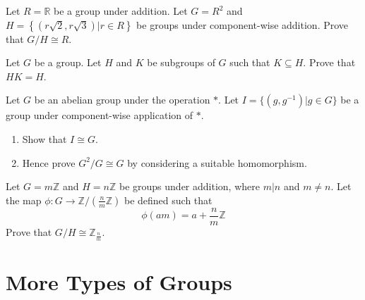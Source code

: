 \begin{problem}
    Let $R = \mathbb{R}$ be a group under addition. Let $G = R^2$ and $H = \left\{(r\sqrt2, r\sqrt3) \vert r\in R\right\}$ be groups under component-wise addition. Prove that $G/H \cong R$.
\end{problem}

\begin{problem}\label{problem-subgroup-product-equal-to-subgroup-if-one-is-subgroup-of-another}
    Let $G$ be a group. Let $H$ and $K$ be subgroups of $G$ such that $K \subseteq H$. Prove that $HK = H$.
\end{problem}

\begin{problem}\label{problem-cartesian-product-of-group-by-group-isomorphic-to-group}
    Let $G$ be an abelian group under the operation $\ast$. Let $I = \{(g, g^{-1}) \vert g \in G\}$ be a group under component-wise application of $\ast$.
    \begin{enumerate}[label=(\roman*)]
        \item Show that $I \cong G$.
        \item Hence prove $G^2/G \cong G$ by considering a suitable homomorphism.
    \end{enumerate}
\end{problem}

\begin{problem}\label{problem-mZ/nZ-isomorphic-to-Zn/m}
    Let $G = m\mathbb{Z}$ and $H = n\mathbb{Z}$ be groups under addition, where $m\vert n$ and $m \neq n$. Let the map $\phi: G \to \mathbb{Z}/({\frac nm}\mathbb{Z})$ be defined such that
    \[
        \phi(am) = a + \frac nm \mathbb{Z}
    \]
    Prove that $G/H \cong \mathbb{Z}_{\frac nm}$.
\end{problem}

\chapter{More Types of Groups}
